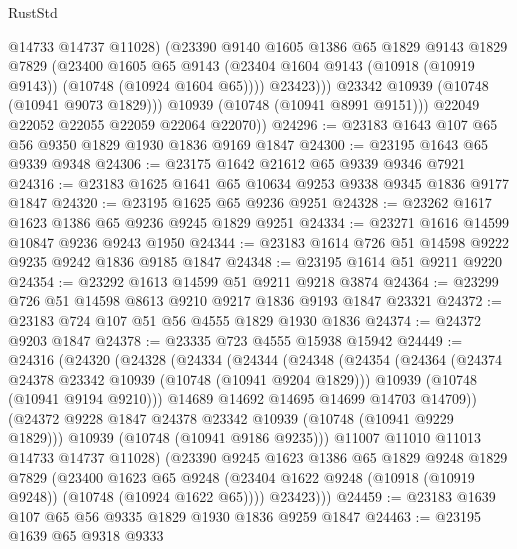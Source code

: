 \begin{lexlean}{RustStd}
\begin{coremodule}
                  @14733
                  @14737
                  @11028)
                (@23390
                  @9140
                  @1605
                  @1386
                  @65
                  @1829
                  @9143
                  @1829
                  @7829
                  (@23400
                    @1605
                    @65
                    @9143
                    (@23404 @1604 @9143 (@10918 (@10919 @9143)) (@10748 (@10924 @1604 @65))))
                  @23423)))
            @23342
            @10939
            (@10748 (@10941 @9073 @1829)))
          @10939
          (@10748 (@10941 @8991 @9151)))
        @22049
        @22052
        @22055
        @22059
        @22064
        @22070))
@24296 := @23183 @1643 @107 @65 @56 @9350 @1829 @1930 @1836 @9169 @1847
@24300 := @23195 @1643 @65 @9339 @9348
@24306 := @23175 @1642 @21612 @65 @9339 @9346 @7921
@24316 := @23183 @1625 @1641 @65 @10634 @9253 @9338 @9345 @1836 @9177 @1847
@24320 := @23195 @1625 @65 @9236 @9251
@24328 := @23262 @1617 @1623 @1386 @65 @9236 @9245 @1829 @9251
@24334 := @23271 @1616 @14599 @10847 @9236 @9243 @1950
@24344 := @23183 @1614 @726 @51 @14598 @9222 @9235 @9242 @1836 @9185 @1847
@24348 := @23195 @1614 @51 @9211 @9220
@24354 := @23292 @1613 @14599 @51 @9211 @9218 @3874
@24364 := @23299 @726 @51 @14598 @8613 @9210 @9217 @1836 @9193 @1847 @23321
@24372 := @23183 @724 @107 @51 @56 @4555 @1829 @1930 @1836
@24374 := @24372 @9203 @1847
@24378 := @23335 @723 @4555 @15938 @15942
@24449 := @24316
    (@24320
      (@24328
        (@24334
          (@24344
            (@24348
              (@24354
                (@24364
                  (@24374 @24378 @23342 @10939 (@10748 (@10941 @9204 @1829)))
                  @10939
                  (@10748 (@10941 @9194 @9210)))
                @14689
                @14692
                @14695
                @14699
                @14703
                @14709))
            (@24372 @9228 @1847 @24378 @23342 @10939 (@10748 (@10941 @9229 @1829)))
            @10939
            (@10748 (@10941 @9186 @9235)))
          @11007
          @11010
          @11013
          @14733
          @14737
          @11028)
        (@23390
          @9245
          @1623
          @1386
          @65
          @1829
          @9248
          @1829
          @7829
          (@23400
            @1623
            @65
            @9248
            (@23404 @1622 @9248 (@10918 (@10919 @9248)) (@10748 (@10924 @1622 @65))))
          @23423)))
@24459 := @23183 @1639 @107 @65 @56 @9335 @1829 @1930 @1836 @9259 @1847
@24463 := @23195 @1639 @65 @9318 @9333

\end{coremodule}
\end{lexlean}

